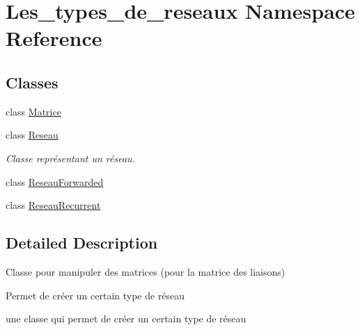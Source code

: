 \hypertarget{namespace_les__types__de__reseaux}{}\section{Les\+\_\+types\+\_\+de\+\_\+reseaux Namespace Reference}
\label{namespace_les__types__de__reseaux}
\subsection*{Classes}
\begin{DoxyCompactItemize}
\item 
class \hyperlink{class_les__types__de__reseaux_1_1_matrice}{Matrice}
\item 
class \hyperlink{class_les__types__de__reseaux_1_1_reseau}{Reseau}
\begin{DoxyCompactList}\small\item\em Classe représentant un réseau. \end{DoxyCompactList}\item 
class \hyperlink{class_les__types__de__reseaux_1_1_reseau_forwarded}{Reseau\+Forwarded}
\item 
class \hyperlink{class_les__types__de__reseaux_1_1_reseau_recurrent}{Reseau\+Recurrent}
\end{DoxyCompactItemize}


\subsection{Detailed Description}
Classe pour manipuler des matrices (pour la matrice des liaisons)

Permet de créer un certain type de réseau

une classe qui permet de créer un certain type de réseau 